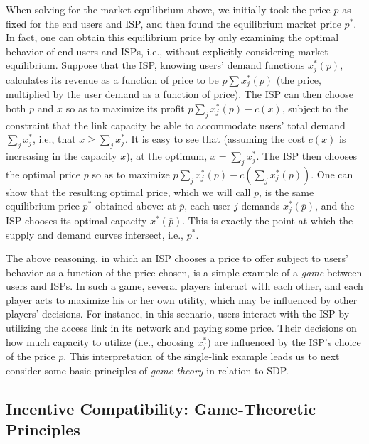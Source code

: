 When solving for the market equilibrium above, we initially took the price $p$ as fixed for the end users and ISP, and then found the equilibrium market price $p^\ast$. In fact, one can obtain this equilibrium price by only examining the optimal behavior of end users and ISPs, i.e., without explicitly considering market equilibrium. Suppose that the ISP, knowing users' demand functions $x_j^\ast(p)$, calculates its revenue as a function of price to be $p\sum x_j^\ast(p)$ (the price, multiplied by the user demand as a function of price). The ISP can then choose both $p$ and $x$ so as to maximize its profit $p\sum_j x_j^\ast(p) - c(x)$, subject to the constraint that the link capacity be able to accommodate users' total demand $\sum_j x_j^\ast$, i.e., that $x \geq \sum_j x_j^\ast$. It is easy to see that (assuming the cost $c(x)$ is increasing in the capacity $x$), at the optimum, $x = \sum_j x_j^\ast$. The ISP then chooses the optimal price $p$ so as to maximize $p\sum_j x_j^\ast(p) - c\left(\sum_j x_j^\ast(p)\right)$. One can show that the resulting optimal price, which we will call $\overline{p}$, is the same equilibrium price $p^\ast$ obtained above: at $\overline{p}$, each user $j$ demands $x_j^\ast(\overline{p})$, and the ISP chooses its optimal capacity $x^\ast(\overline{p})$. This is exactly the point at which the supply and demand curves intersect, i.e., $p^\ast$.

The above reasoning, in which an ISP chooses a price to offer subject to users' behavior as a function of the price chosen, is a simple example of a \emph{game} between users and ISPs. In such a game, several players interact with each other, and each player acts to maximize his or her own utility, which may be influenced by other players' decisions. For instance, in this scenario, users interact with the ISP by utilizing the access link in its network and paying some price. Their decisions on how much capacity to utilize (i.e., choosing $x_j^\ast$) are influenced by the ISP's choice of the price $p$. This interpretation of the single-link example leads us to next consider some basic principles of \emph{game theory} in relation to SDP.

\subsection{Incentive Compatibility: Game-Theoretic Principles}\label{sec:gametheory}


